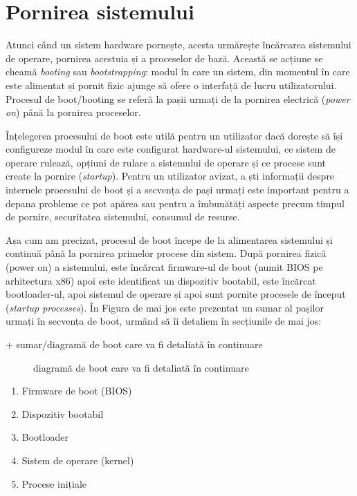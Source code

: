 \chapter{Pornirea sistemului}
\label{chapter:boot}

Atunci când un sistem hardware pornește, acesta urmărește încărcarea sistemului
de operare, pornirea acestuia și a proceselor de bază. Această se acțiune se
cheamă \textit{booting} sau \textit{bootstrapping}: modul în care un sistem, din momentul în care
este alimentat și pornit fizic ajunge să ofere o interfață de lucru
utilizatorului. Procesul de boot/booting se referă la pașii urmați de la
pornirea electrică (\textit{power on}) până la pornirea proceselor.

Înțelegerea procesului de boot este utilă pentru un utilizator dacă dorește să
își configureze modul în care este configurat hardware-ul sistemului, ce sistem
de operare rulează, opțiuni de rulare a sistemului de operare și ce procese sunt
create la pornire (\textit{startup}). Pentru un utilizator avizat, a ști informații
despre internele procesului de boot și a secvența de pași urmați este important
pentru a depana probleme ce pot apărea sau pentru a îmbunătăți aspecte precum
timpul de pornire, securitatea sistemului, consumul de resurse.

Așa cum am precizat, procesul de boot începe de la alimentarea sistemului și
continuă până la pornirea primelor procese din sistem. După pornirea fizică
(power on) a sistemului, este încărcat firmware-ul de boot (numit BIOS pe
arhitectura x86) apoi este identificat un dispozitiv bootabil, este încărcat
bootloader-ul, apoi sistemul de operare și apoi sunt pornite procesele de
început (\textit{startup processes}). În Figura de mai jos este prezentat un sumar al
pașilor urmați în secvența de boot, urmând să îi detaliem în secțiunile de mai
jos:

+ sumar/diagramă de boot care va fi detaliată în continuare
\begin{figure}[htbp]
	\centering
	\def\svgwidth{\columnwidth}
	
	\caption{diagramă de boot care va fi detaliată în continuare}
	\label{fig:boot-seq}
\end{figure}

\begin{enumerate}
	\item Firmware de boot (BIOS)
	\item Dispozitiv bootabil
	\item Bootloader
	\item Sistem de operare (kernel)
	\item Procese inițiale
\end{enumerate}

